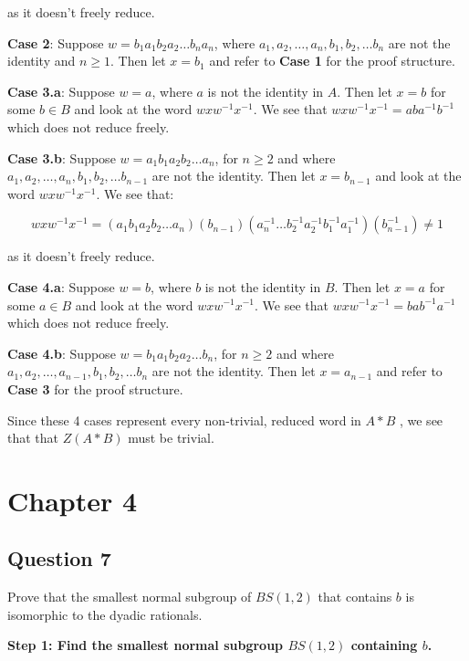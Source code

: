 \documentclass[12pt]{article}%
\begin{document}
as it doesn't freely reduce.

\textbf{Case 2}: Suppose $w=b_{1}a_{1}b_{2}a_{2}\ldots b_{n}a_{n}$, where
$a_1,a_2,\ldots ,a_n, b_1,b_2,\ldots b_n$ are not the identity and $n\geq 1$. Then let $x=b_1$ and refer
to \textbf{Case 1} for the proof structure. 

\textbf{Case 3.a}:
Suppose $w=a$, where $a$ is not the identity in $A$. Then let $x=b$ for some $b\in B$ and look at the word
$wxw^{-1}x^{-1}$. We see that $wxw^{-1}x^{-1}=aba^{-1}b^{-1}$ which does not reduce freely.

\textbf{Case 3.b}: 
Suppose $w=a_{1}b_{1}a_{2}b_{2}\ldots a_{n}$, for $n\geq 2$ and where $a_1,a_2,\ldots ,a_n, b_1,b_2,\ldots b_{n-1}$ are not the identity. Then let $x=b_{n-1}$ and look at the word $wxw^{-1}x^{-1}$. We see that:

\begin{dmath}
wxw^{-1}x^{-1}=(a_{1}b_{1}a_{2}b_{2}\ldots a_{n})(b_{n-1})(a_{n}^{-1}\ldots b_{2}^{-1}a_{2}^{-1}b_{1}^{-1}a_{1}^{-1})(b_{n-1}^{-1}) \neq 1
\end{dmath}

as it doesn't freely reduce.

\textbf{Case 4.a}:
Suppose $w=b$, where $b$ is not the identity in $B$. Then let $x=a$ for some $a\in B$ and look at the word
$wxw^{-1}x^{-1}$. We see that $wxw^{-1}x^{-1}=bab^{-1}a^{-1}$ which does not reduce freely.

\textbf{Case 4.b}: Suppose $w=b_{1}a_{1}b_{2}a_{2}\ldots b_{n}$, for $n\geq 2$ and where
$a_1,a_2,\ldots ,a_{n-1}, b_1,b_2,\ldots b_n$ are not the identity. Then let $x=a_{n-1}$ and refer to
\textbf{Case 3} for the proof structure. 

Since these 4 cases represent every non-trivial, reduced word in $A*B$ , we see that that $Z(A*B)$ must
be trivial.

\section*{Chapter 4}

\subsection*{Question 7}

Prove that the smallest normal subgroup of $BS(1, 2)$ that contains $b$ is isomorphic to the dyadic
rationals.

\textbf{Step 1: Find the smallest normal subgroup $BS(1,2)$ containing $b$.}
\end{document}
